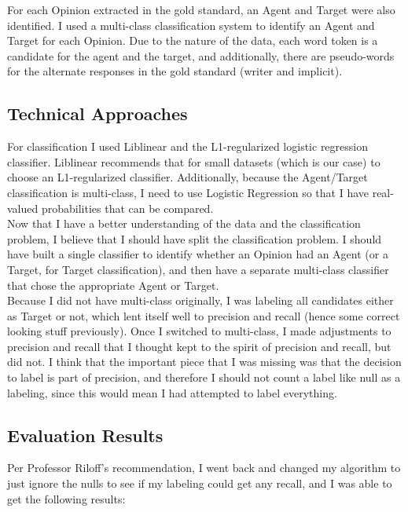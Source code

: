 \documentclass{article}
\begin{document}
    For each Opinion extracted in the gold standard, an Agent and Target were also identified. I used a multi-class classification system to identify an Agent and Target for each Opinion. Due to the nature of the data, each word token is a candidate for the agent and the target, and additionally, there are pseudo-words for the alternate responses in the gold standard (writer and implicit).

    \subsection{Technical Approaches}
    For classification I used Liblinear and the L1-regularized logistic regression classifier. Liblinear recommends that for small datasets (which is our case) to choose an L1-regularized classifier. Additionally, because the Agent/Target classification is multi-class, I need to use Logistic Regression so that I have real-valued probabilities that can be compared. \\

    Now that I have a better understanding of the data and the classification problem, I believe that I should have split the classification problem. I should have built a single classifier to identify whether an Opinion had an Agent (or a Target, for Target classification), and then have a separate multi-class classifier that chose the appropriate Agent or Target.\\

    Because I did not have multi-class originally, I was labeling all candidates either as Target or not, which lent itself well to precision and recall (hence some correct looking stuff previously). Once I switched to multi-class, I made adjustments to precision and recall that I thought kept to the spirit of precision and recall, but did not. I think that the important piece that I was missing was that the decision to label is part of precision, and therefore I should not count a label like null as a labeling, since this would mean I had attempted to label everything. \\

    \subsection{Evaluation Results}

    Per Professor Riloff's recommendation, I went back and changed my algorithm to just ignore the nulls to see if my labeling could get any recall, and I was able to get the following results:\\
\end{document}
